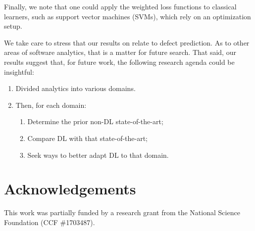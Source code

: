 \documentclass[10pt,compsoc,twocolumn]{IEEEtran}
\begin{document}
Finally, we note that one could apply the weighted loss functions to classical learners, such as support vector machines (SVMs), which rely on an optimization setup.



 

 We take  care to stress that our results on relate to defect prediction. As to other areas of software analytics, that is a matter for future search. That said,
our results suggest that, for future work, the following research agenda could be insightful:
 \begin{enumerate}
\item
 Divided analytics into various domains. 
 \item
 Then, for each domain:
 \begin{enumerate}\item
 Determine the prior non-DL state-of-the-art; \item Compare DL with that state-of-the-art; 
 \item Seek ways to better adapt DL to that domain.
 \end{enumerate}\end{enumerate} 
 
 
\section*{Acknowledgements}
This work was partially funded by 
a research grant from the National Science Foundation (CCF \#1703487).
\end{document}
